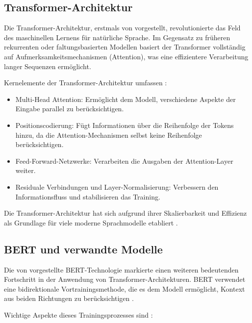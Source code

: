 \subsection{Transformer-Architektur}
\label{subsec:transformer-architecture}

Die Transformer-Architektur, erstmals von \textcite{VaswaniAshish2023AIAY} vorgestellt, revolutionierte das Feld des maschinellen Lernens für natürliche Sprache. Im Gegensatz zu früheren rekurrenten oder faltungsbasierten Modellen basiert der Transformer vollständig auf Aufmerksamkeitsmechanismen (Attention), was eine effizientere Verarbeitung langer Sequenzen ermöglicht.

Kernelemente der Transformer-Architektur umfassen \parencite{VaswaniAshish2023AIAY}:

\begin{itemize}
	\item Multi-Head Attention: Ermöglicht dem Modell, verschiedene Aspekte der Eingabe parallel zu berücksichtigen.
	\item Positionscodierung: Fügt Informationen über die Reihenfolge der Tokens hinzu, da die Attention-Mechanismen selbst keine Reihenfolge berücksichtigen.
	\item Feed-Forward-Netzwerke: Verarbeiten die Ausgaben der Attention-Layer weiter.
	\item Residuale Verbindungen und Layer-Normalisierung: Verbessern den Informationsfluss und stabilisieren das Training.
\end{itemize}

Die Transformer-Architektur hat sich aufgrund ihrer Skalierbarkeit und Effizienz als Grundlage für viele moderne Sprachmodelle etabliert \parencite{VaswaniAshish2023AIAY}.

\subsection{BERT und verwandte Modelle}
\label{subsec:bert-und-verwandte-modelle}

Die von \textcite{DevlinJacob2019BPoD} vorgestellte \gls{BERT}-Technologie markierte einen weiteren bedeutenden Fortschritt in der Anwendung von Transformer-Architekturen. BERT verwendet eine bidirektionale Vortrainingsmethode, die es dem Modell ermöglicht, Kontext aus beiden Richtungen zu berücksichtigen \parencite{DevlinJacob2019BPoD}.

Wichtige Aspekte dieses Trainingsprozesses sind \parencite{DevlinJacob2019BPoD}:

